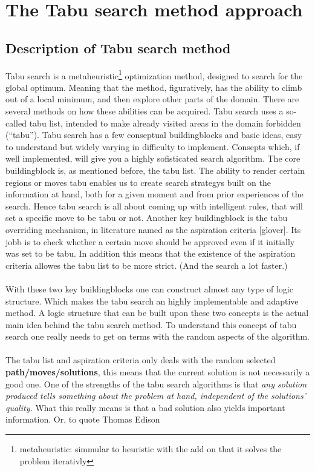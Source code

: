 \section{The Tabu search method approach}
\subsection{Description of Tabu search method}
Tabu search is a metaheuristic\footnote{ metaheuristic: simmular to heuristic with the add on that it solves the problem iterativly} optimization method, designed to search for the global optimum. Meaning that the method, figuratively, has the ability to climb out of a local minimum, and then explore other parts of the domain. There are several methods on how these abilities can be acquired. Tabu search uses a so-called tabu list, intended to make already visited areas in the domain forbidden (``tabu''). Tabu search has a few conseptual buildingblocks and basic ideas, easy to understand but widely varying in difficulty to implement. Consepts which, if well implemented, will give you a highly sofisticated search algorithm. The core buildingblock is, as mentioned before, the tabu list. The ability to render certain regions or moves tabu enables us to create search strategys built on the information at hand, both for a given moment and from prior experiences of the search. Hence tabu search is all about coming up with intelligent rules, that will set a specific move to be tabu or not. Another key buildingblock is the tabu overriding mechanism, in literature named as the aspiration criteria [glover]. Its jobb is to check whether a certain move should be approved even if it initially was set to be tabu. In addition this means that the existence of the aspiration criteria allowes the tabu list to be more strict. (And the search a lot faster.)\\
\\
With these two key buildingblocks one can construct almost any type of logic structure. Which makes the tabu search an highly implementable and adaptive method. A logic structure that can be built upon these two concepts is the actual main idea behind the tabu search method. To understand this concept of tabu search one really needs to get on terms with the random aspects of the algorithm.\\
\\The tabu list and aspiration criteria only deals with the random selected \textbf{path/moves/solutions}, this means that the current solution is not necessarily a good one. One of the strengths of the tabu search algorithms is that \emph{any solution produced tells something about the problem at hand, independent of the solutions' quality.} What this really means is that a bad solution also yields important information.  Or, to quote Thomas Edison 

